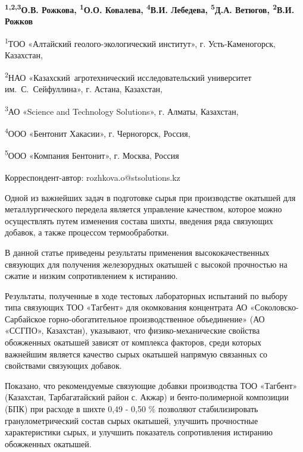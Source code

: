 \vspace{-0.5em}
\begin{articleheader}

{\bfseries
\textsuperscript{1,2,3}О.В. Рожкова\textsuperscript{\envelope },
\textsuperscript{1}О.О. Ковалева,
\textsuperscript{4}В.И. Лебедева,
\textsuperscript{5}Д.А. Ветюгов,
\textsuperscript{2}В.И. Рожков
}
\end{articleheader}

\begin{affiliation}
\textsuperscript{1}ТОО «Алтайский геолого-экологический институт», г. Усть-Каменогорск, Казахстан,

\textsuperscript{2}НАО «Казахский~агротехнический исследовательский университет им.~С.~Сейфуллина», г. Астана, Казахстан,

\textsuperscript{3}АО «Science and Technology Solutions», г. Алматы, Казахстан,

\textsuperscript{4}ООО «Бентонит Хакасии», г. Черногорск, Россия,

\textsuperscript{5}ООО «Компания Бентонит», г. Москва, Россия

\raggedright \textsuperscript{\envelope }Корреспондент-автор: rozhkova.o@stsolutions.kz
\end{affiliation}

Одной из важнейших задач в подготовке сырья при производстве окатышей
для металлургического передела является управление качеством, которое
можно осуществлять путем изменения состава шихты, введения ряда
связующих добавок, а также процессом термообработки.

В данной статье приведены результаты применения высококачественных
связующих для получения железорудных окатышей с высокой прочностью на
сжатие и низким сопротивлением к истиранию.

Результаты, полученные в ходе тестовых лабораторных испытаний по выбору
типа связующих ТОО «Тагбент» для окомкования концентрата АО
«Соколовско-Сарбайское горно-обогатительное производственное
объединение» (АО «ССГПО», Казахстан), указывают, что физико-механические
свойства обожженных окатышей зависят от комплекса факторов, среди
которых важнейшим является качество сырых окатышей напрямую связанных со
свойствами связующих добавок.

Показано, что рекомендуемые связующие добавки производства ТОО «Тагбент»
(Казахстан, Тарбагатайский район с. Акжар) и бенто-полимерной композиции
(БПК) при расходе в шихте 0,49 - 0,50 \% позволяют стабилизировать
гранулометрический состав сырых окатышей, улучшить прочностные
характеристики сырых, и улучшить показатель сопротивления истиранию
обожженных окатышей.

